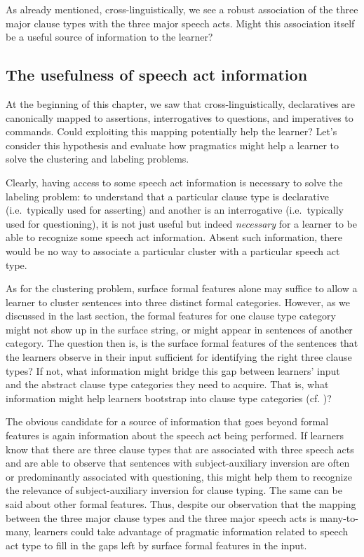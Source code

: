 As already mentioned, cross-linguistically, we see a robust association of the three major clause types with the three major speech acts. Might this association itself be a useful source of information to the learner?

\subsection{The usefulness of speech act information}
\label{sec:intro:cl:prag}

At the beginning of this chapter, we saw that cross-linguistically, declaratives are canonically mapped to assertions, interrogatives to questions, and imperatives to commands. Could exploiting this mapping potentially help the learner? Let's consider this hypothesis and evaluate how pragmatics might help a learner to solve the clustering and labeling problems.

Clearly, having access to some speech act information is necessary to solve the labeling problem: to understand that a particular clause type is declarative (i.e.\ typically used for asserting) and another is an interrogative (i.e.\ typically used for questioning), it is not just useful but indeed \emph{necessary} for a learner to be able to recognize some speech act information. Absent such information, there would be no way to associate a particular cluster with a particular speech act type.

As for the clustering problem, surface formal features alone may suffice to allow a learner to cluster sentences into three distinct formal categories. However, as we discussed in the last section, the formal features for one clause type category might not show up in the surface string, or might appear in sentences of another category. The question then is, is the surface formal features of the sentences that the learners observe in their input sufficient for identifying the right three clause types? If not, what information might bridge this gap between learners' input and the abstract clause type categories they need to acquire. That is, what information might help learners bootstrap into clause type categories (cf. \cite{pinker1984, gleitman1990, hacquardlidz2018})? 

The obvious candidate for a source of information that goes beyond formal features is again information about the speech act being performed. If learners know that there are three clause types that are associated with three speech acts and are able to observe that sentences with subject-auxiliary inversion are often or predominantly associated with questioning, this might help them to recognize the relevance of subject-auxiliary inversion for clause typing. The same can be said about other formal features. Thus, despite our observation that the mapping between the three major clause types and the three major speech acts is many-to-many, learners could take advantage of pragmatic information related to speech act type to fill in the gaps left by surface formal features in the input. 

